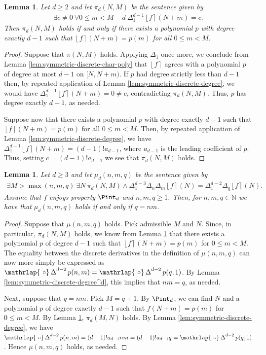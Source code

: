\documentclass{amsart}
\newtheorem{lemma}[theorem]{Lemma}
\theoremstyle{definition}
\newcommand{\nint}[1]{\left\lfloor #1 \right\rceil}
\newcommand{\NN}{\mathbb{N}}
\newcommand{\DeltaS}{\operatorname{\mathrlap{\ \circ}\operatorname{\Delta}}}
\begin{document}
\begin{lemma}\label{lem:polynomial-sequence-agreement}
	Let $d \geq 2$ and let $\pi_d(N,M)$ be the sentence given by
	\begin{align*}
	\exists c \neq 0 \ \forall 0 \leq m < M-d \  \Delta^{d-1}_1 \nint{f}(N+m) = c.   
	\end{align*}
	Then $\pi_d(N,M)$ holds if and only if there exists a polynomial $p$ with degree exactly $d-1$ such that $\nint{f}(N+m) = p(m)$ for all $0 \leq m < M$.
\end{lemma}
\begin{proof}
	Suppose that $\pi(N,M)$ holds. Applying $\Delta_1$ once more, we conclude from Lemma \ref{lem:symmetric-discrete-char-poly} that $\nint{f}$ agrees with a polynomial $p$ of degree at most $d-1$ on $[N,N+m)$. If $p$ had degree strictly less than $d-1$ then, by repeated application of Lemma \ref{lem:symmetric-discrete-degree}, we would have $\Delta^{d-1}_1 \nint{f}(N+m) = 0 \neq c$, contradicting $\pi_d(N,M)$. Thus, $p$ has degree exactly $d-1$, as needed.
	
	Suppose now that there exists a polynomial $p$ with degree exactly $d-1$ such that $\nint{f}(N+m) = p(m)$ for all $0 \leq m < M$. Then, by repeated application of Lemma \ref{lem:symmetric-discrete-degree}, we have $\Delta_1^{d-1} \nint{f}(N+m) = (d-1)! a_{d-1}$, where $a_{d-1}$ is the leading coefficient of $p$. Thus, setting $c = (d-1)! a_{d-1}$ we see that $\pi_d(N,M)$ holds.
\end{proof}

\begin{lemma}\label{lem:multiplication-definition}
	Let $d \geq 3$ and let $\mu_d(n,m,q)$ be the sentence given by
	\begin{align*}
	\exists M > \max(n,m,q) \ \exists N \ \pi_d(N,M) \wedge 
	\Delta_1^{d-3} \Delta_n \Delta_m \nint{f}(N) =
	\Delta_1^{d-2} \Delta_q \nint{f}(N).
	\end{align*}
	Assume that $f$ enjoys property $\Pint_d$ and $n,m,q \geq 1$. Then, for $n,m,q \in \NN$ we have that $\mu_d(n,m,q)$ holds if and only if $q = nm$.
\end{lemma}
\begin{proof}
Suppose that $\mu(n,m,q)$ holds. Pick admissible $M$ and $N$. Since, in particular, $\pi_d(N,M)$ holds, we know from Lemma \ref{lem:polynomial-sequence-agreement} that there exists a polynomial $p$ of degree $d-1$ such that $\nint{f}(N+m) = p(m)$ for $0 \leq m < M$. The equality between the discrete derivatives in the definition of $\mu(n,m,q)$ can now more simply be expressed as $\DeltaS^{d-2}p(n,m) = \DeltaS^{d-2}p(q,1)$. By Lemma \ref{lem:symmetric-discrete-degree^d}, this implies that $nm = q$, as needed. 

Next, suppose that $q = nm$. Pick $M = q+1$. By $\Pint_d$, we can find $N$ and a polynomial $p$ of degree exactly $d-1$ such that $f(N+m) = p(m)$ for $0 \leq m < M$. By Lemma \ref{lem:polynomial-sequence-agreement}, $\pi_d(M,N)$ holds. By Lemma \ref{lem:symmetric-discrete-degree}, we have 
$\DeltaS^{d-2}p(n,m) = (d-1)! a_{d-1} nm = (d-1)! a_{d-1} q = \DeltaS^{d-2}p(q,1)$. Hence $\mu(n,m,q)$ holds, as needed.
\end{proof}
\end{document}
